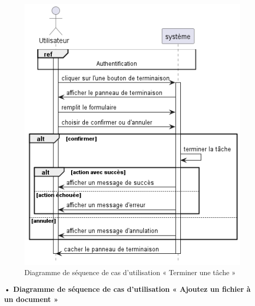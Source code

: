 \begin{figure}[H]
  \centering
  \includegraphics[width=1\textwidth]{out/diagrams/documents/terminer_task/terminer_task}
  \caption{Diagramme de séquence de cas d'utilisation « Terminer une tâche  »}
  \label{fig:sequence_terminer_task}
\end{figure}
\textbf{•	Diagramme de séquence de cas d'utilisation « Ajoutez un fichier à un document  »}

